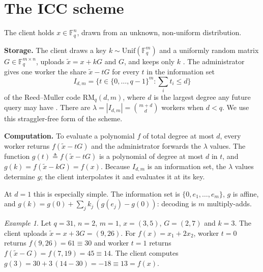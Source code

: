 \documentclass[conference]{IEEEtran}
\theoremstyle{remark}
\newtheorem{example}{Example}
\newcommand{\F}{\mathbb{F}}
\newcommand{\xt}{\tilde{x}}
\begin{document}
\section{The ICC scheme}\label{sec:icc}

The client holds $x\in\F_q^n$, drawn from an unknown, non-uniform distribution.

\textbf{Storage.} The client draws a key $k\sim\mathrm{Unif}(\F_q^m)$ and a uniformly random
matrix $G\in\F_q^{m\times n}$, uploads $\xt=x+kG$ and $G$, and keeps only $k$
\cite{icc2025}. The administrator gives one worker the share $\xt-tG$ for every $t$ in the
information set
\[
I_{d,m}=\{t\in\{0,\dots,q-1\}^m:\textstyle\sum_i t_i\le d\}
\]
of the Reed--Muller code $\mathrm{RM}_q(d,m)$, where $d$ is the largest degree any future
query may have \cite{deng2024}. There are $\lambda=|I_{d,m}|=\binom{m+d}{d}$ workers when
$d<q$. We use this straggler-free form of the scheme.

\textbf{Computation.} To evaluate a polynomial $f$ of total degree at most $d$, every
worker returns $f(\xt-tG)$ and the administrator forwards the $\lambda$ values. The
function $g(t)\triangleq f(\xt-tG)$ is a polynomial of degree at most $d$ in $t$, and
$g(k)=f(\xt-kG)=f(x)$. Because $I_{d,m}$ is an information set, the $\lambda$ values
determine $g$; the client interpolates it and evaluates it at its key.

At $d=1$ this is especially simple. The information set is $\{0,e_1,\dots,e_m\}$, $g$ is
affine, and $g(k)=g(0)+\sum_j k_j\,(g(e_j)-g(0))$: decoding is $m$ multiply-adds.

\begin{example}
Let $q=31$, $n=2$, $m=1$, $x=(3,5)$, $G=(2,7)$ and $k=3$. The client uploads
$\xt=x+3G=(9,26)$. For $f(x)=x_1+2x_2$, worker $t=0$ returns $f(9,26)=61\equiv30$ and worker
$t=1$ returns $f(\xt-G)=f(7,19)=45\equiv14$. The client computes
$g(3)=30+3\,(14-30)=-18\equiv13=f(x)$.
\end{example}
\end{document}
